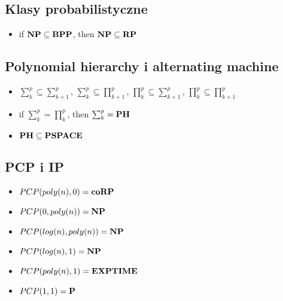 \subsection{Klasy probabilistyczne}
\begin{itemize}
    \item if $\NP \subseteq \BPP$, then $\NP \subseteq \RP$
\end{itemize}


\subsection{Polynomial hierarchy i alternating machine}
\begin{itemize}
    \item $\sum_k^p \subseteq \sum_{k+1}^p$, $\sum_k^p \subseteq \prod_{k+1}^p$, $\prod_k^p \subseteq \sum_{k+1}^p$, $\prod_k^p \subseteq \prod_{k+1}^p$
    \item if $\sum_k^p = \prod_k^p$, then $\sum_k^p = \PH$
    \item $\PH \subseteq \PSPACE$
    
    
    

   
    
\end{itemize}

\subsection{PCP i IP}
\begin{itemize}
    \item $PCP(poly(n), 0) = \co\RP$
    \item $PCP(0, poly(n))= \NP$
    \item $PCP(log(n), poly(n)) = \NP$
    \item $PCP(log(n), 1) = \NP$
    \item $PCP(poly(n), 1) = \EXPTIME$
    \item $PCP(1,1) = \P $
\end{itemize}